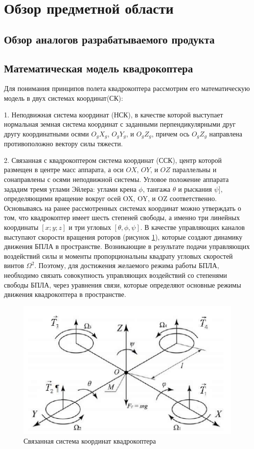 
\section{Обзор предметной области}

\subsection{Обзор аналогов разрабатываемого продукта}
\subsection{Математическая модель квадрокоптера}

Для понимания принципов полета квадрокоптера рассмотрим его математическую модель в двух системах координат(СК):

1. Неподвижная система координат (НСК), в качестве которой выступает нормальная земная система координат с заданными перпендикулярными друг другу координатными осями \(O_{g}X_{g}\), \(O_{g}Y_{g}\), и \(O_{g}Z_{g}\), причем ось \(O_{g}Z_{g}\) направлена противоположно вектору силы тяжести.

2. Связанная с квадрокоптером система координат (ССК), центр которой размещен в центре масс аппарата, а оси \(OX\), \(OY\), и \(OZ\) параллельны и сонаправлены с осями неподвижной системы. Угловое положение аппарата зададим тремя углами Эйлера: углами крена \(\phi\), тангажа \(\theta\) и рыскания \(\psi]\), определяющими вращение вокруг осей OX, OY, и OZ соответственно. Основываясь на ранее рассмотренных системах координат можно утверждать о том, что квадрокоптер имеет шесть степеней свободы, а именно три линейных координаты \([x; y; z ]\) и три угловых \([\theta, \phi, \psi]\). В качестве управляющих каналов выступают скорости вращения роторов (рисунок \ref{fig:ris1}), которые создают динамику движения БПЛА в пространстве. Возникающие в результате подачи управляющих воздействий силы и моменты пропорциональны квадрату угловых скоростей винтов \(\Omega^2\). Поэтому, для достижения желаемого режима работы БПЛА, необходимо связать совокупность управляющих воздействий со степенями свободы БПЛА, через уравнения связи, которые определяют основные режимы движения квадрокоптера в пространстве.
\begin{figure}[H]
	\centering
	\includegraphics[width=0.5\linewidth]{../RW/pics/ris1}
	\caption{Связанная система координат квадрокоптера
	}
	\label{fig:ris1}
\end{figure}

